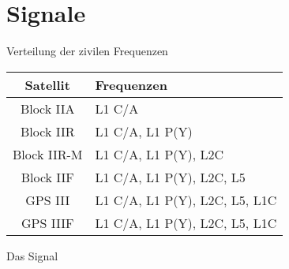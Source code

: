 \section{Signale}
\label{sec:signale}

\begin{frame}{Verteilung der zivilen Frequenzen}
    \begin{table}
        \begin{tabular}{c l}
            \toprule
            {Satellit} & {Frequenzen} \\
            \midrule
            Block IIA   & L1 C/A \\
            Block IIR   & L1 C/A, L1 P(Y) \\
            Block IIR-M & L1 C/A, L1 P(Y), L2C \\
            Block IIF   & L1 C/A, L1 P(Y), L2C, L5 \\
            GPS III     & L1 C/A, L1 P(Y), L2C, L5, L1C \\
            GPS IIIF    & L1 C/A, L1 P(Y), L2C, L5, L1C \\
            \bottomrule
        \end{tabular}
    \end{table}
\end{frame}

\begin{frame}{Das Signal}
    \begin{columns}
        
    \end{columns}
\end{frame}
